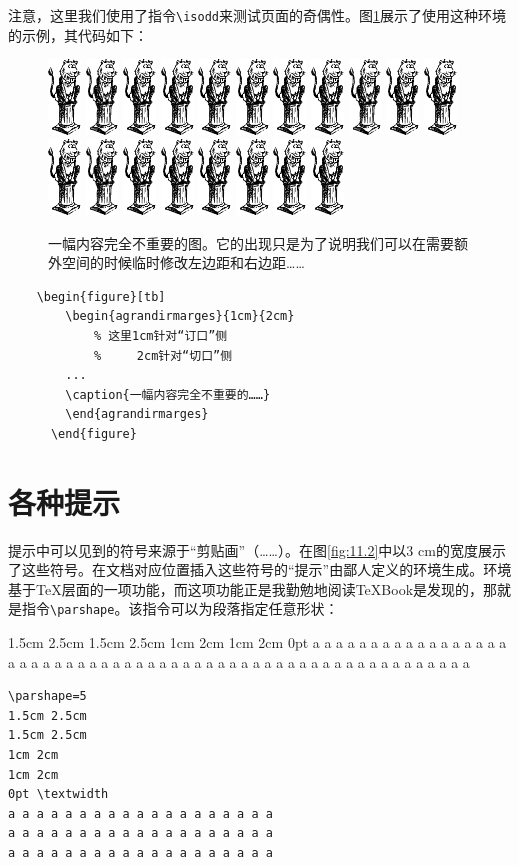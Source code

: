 注意，这里我们使用了指令\verb|\isodd|来测试页面的奇偶性。图\ref{fig:11.1}展示了使用这种环境的示例，其代码如下：

\begin{figure}[bt]
    \centering
    \newcommand{\graphtex}{%
      \includegraphics[height=2cm]{img/knuth-tex}}
    \begin{agrandirmarges}{1cm}{2cm}
      \begin{center}
        \graphtex\graphtex\graphtex\graphtex\graphtex%
        \graphtex\graphtex\graphtex\graphtex\graphtex%
        \graphtex\graphtex\graphtex\graphtex\graphtex%
        \graphtex\graphtex\graphtex\graphtex%
      \end{center}
    \caption{一幅内容完全不重要的图。它的出现只是为了说明我们可以在需要额外空间的时候临时修改左边距和右边距……}
    \label{fig:11.1}
    \end{agrandirmarges}
\end{figure}

\begin{dmd}
\begin{verbatim}
    \begin{figure}[tb]
        \begin{agrandirmarges}{1cm}{2cm}
            % 这里1cm针对“订口”侧
            %     2cm针对“切口”侧
        ...
        \caption{一幅内容完全不重要的……}
        \end{agrandirmarges}
      \end{figure}\end{verbatim}
\end{dmd}

\section{各种提示}

提示中可以见到的符号来源于“剪贴画”（……）。在图\ref{fig:11.2}中以3 cm的宽度展示了这些符号。在文档对应位置插入这些符号的“提示”由鄙人定义的环境生成。环境基于\TeX 层面的一项功能，而这项功能正是我勤勉地阅读\TeX Book是发现的，那就是指令\verb|\parshape|。该指令可以为段落指定任意形状：

\begin{codelist}[11.5]{
1.5cm 2.5cm
1.5cm 2.5cm
1cm 2cm
1cm 2cm
0pt \textwidth 
a a a a a a a a a a a a a a a a a a a 
a a a a a a a a a a a a a a a a a a a 
a a a a a a a a a a a a a a a a a a a 
}
\begin{verbatim}
\parshape=5
1.5cm 2.5cm
1.5cm 2.5cm
1cm 2cm
1cm 2cm
0pt \textwidth 
a a a a a a a a a a a a a a a a a a a 
a a a a a a a a a a a a a a a a a a a 
a a a a a a a a a a a a a a a a a a a \end{verbatim}
\end{codelist}

